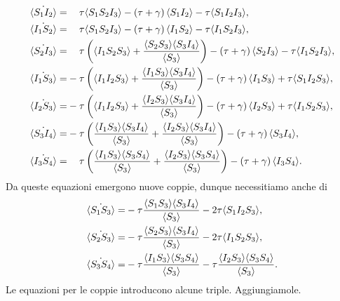   \begin{equation*}
 \begin{aligned}
 \dot{\angol{S_1I_2}} =&\spa \tau\angol{S_1S_2I_3} - \tonde{ \tau + \gamma} \angol{S_1 I_2} -\tau\angol{S_1I_2I_3},\\
\dot{\angol{I_1S_2}} =&\spa\tau\angol{S_1S_2I_3} - \tonde{ \tau + \gamma} \angol{I_1 S_2} -\tau\angol{I_1S_2I_3},\\
\dot{\angol{S_2I_3}} =&\spa \tau\tonde{\angol{I_1S_2S_3} +\frac{\angol{S_2S_3}\angol{S_3I_4}}{\angol{S_3}}} - \tonde{ \tau + \gamma} \angol{S_2 I_3} -\tau\angol{I_1S_2I_3},\\
\dot{\angol{I_1S_3}} =&- \tau\tonde{\angol{I_1I_2S_3} +\frac{\angol{I_1S_3}\angol{S_3I_4}}{\angol{S_3}}} - \tonde{ \tau + \gamma} \angol{I_1 S_3} +\tau\angol{S_1I_2S_3},\\ 
\dot{\angol{I_2S_3}} =&- \tau\tonde{\angol{I_1I_2S_3} +\frac{\angol{I_2S_3}\angol{S_3I_4}}{\angol{S_3}}}- \tonde{ \tau + \gamma} \angol{I_2 S_3} +\tau\angol{I_1S_2S_3},\\ 
\dot{\angol{S_3I_4}} =&- \tau\tonde{\frac{\angol{I_1S_3}\angol{S_3I_4}}{\angol{S_3}}+ \frac{\angol{I_2S_3}\angol{S_3I_4}}{\angol{S_3}}} - \tonde{ \tau + \gamma} \angol{S_3 I_4}, \\ 
\dot{\angol{I_3S_4}} =& \spa \tau\tonde{\frac{\angol{I_1S_3}\angol{S_3S_4}}{\angol{S_3}}+\frac{\angol{I_2S_3}\angol{S_3S_4}}{\angol{S_3}}} - \tonde{ \tau + \gamma} \angol{I_3 S_4}.\\ 
\end{aligned}
 \end{equation*}
 Da queste equazioni emergono nuove coppie, dunque necessitiamo anche di 
 \begin{equation*}
\begin{aligned}
	\dot{\langle S_1S_3 \rangle}=& - \tau \frac{\langle S_1S_3 \rangle\langle S_3I_4 \rangle}{\langle S_3 \rangle}- 2\tau \langle S_1I_2S_3 \rangle,\\
	\dot{\langle S_2S_3 \rangle}=& -\tau \frac{\langle S_2S_3 \rangle\langle S_3I_4 \rangle}{\langle S_3 \rangle} -2\tau \langle I_1S_2S_3 \rangle,\\
	\dot{\langle S_3S_4 \rangle}=& -\tau \frac{\langle I_1S_3 \rangle\langle S_3S_4 \rangle}{\langle S_3 \rangle}-\tau \frac{\langle I_2S_3 \rangle\langle S_3 S_4 \rangle}{\langle S_3 \rangle}.
\end{aligned} 	
 \end{equation*}
 Le equazioni per le coppie introducono alcune triple. Aggiungiamole.
